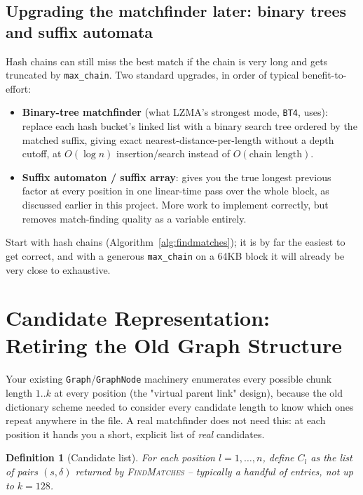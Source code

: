 \documentclass[11pt]{article}
\newtheorem{definition}{Definition}
\begin{document}
\subsection{Upgrading the matchfinder later: binary trees and suffix automata}

Hash chains can still miss the best match if the chain is very long and gets truncated by
\texttt{max\_chain}. Two standard upgrades, in order of typical benefit-to-effort:

\begin{itemize}
  \item \textbf{Binary-tree matchfinder} (what LZMA's strongest mode, \texttt{BT4}, uses):
  replace each hash bucket's linked list with a binary search tree ordered by the
  matched suffix, giving exact nearest-distance-per-length without a depth cutoff, at
  $O(\log n)$ insertion/search instead of $O(\text{chain length})$.
  \item \textbf{Suffix automaton / suffix array}: gives you the true longest previous
  factor at every position in one linear-time pass over the whole block, as discussed
  earlier in this project. More work to implement correctly, but removes match-finding
  quality as a variable entirely.
\end{itemize}

Start with hash chains (Algorithm~\ref{alg:findmatches}); it is by far the easiest to get
correct, and with a generous \texttt{max\_chain} on a 64KB block it will already be very
close to exhaustive.

\section{Candidate Representation: Retiring the Old Graph Structure}
\label{sec:candidates}

Your existing \texttt{Graph}/\texttt{GraphNode} machinery enumerates every possible
chunk length $1..k$ at every position (the "virtual parent link" design), because the
old dictionary scheme needed to consider every candidate length to know which ones
repeat anywhere in the file. A real matchfinder does not need this: at each position it
hands you a short, explicit list of \emph{real} candidates.

\begin{definition}[Candidate list]
For each position $l = 1, \dots, n$, define $C_l$ as the list of pairs $(s, \delta)$
returned by \textsc{FindMatches} -- typically a handful of entries, not up to $k=128$.
\end{definition}
\end{document}
